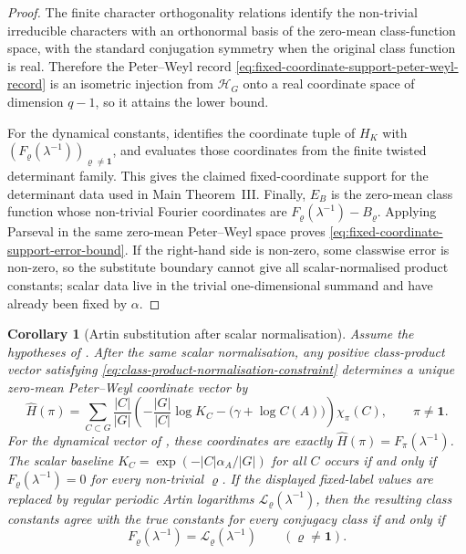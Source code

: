 \documentclass[11pt,a4paper]{amsart}
\theoremstyle{plain}
\newtheorem{corollary}[theorem]{Corollary}
\theoremstyle{definition}
\theoremstyle{remark}
\begin{document}
\begin{proof}
  The finite character orthogonality relations identify the non-trivial
  irreducible characters with an orthonormal basis of the zero-mean
  class-function space, with the standard conjugation symmetry when the
  original class function is real.  Therefore the Peter--Weyl record
  \eqref{eq:fixed-coordinate-support-peter-weyl-record} is an isometric injection
  from \(\mathcal H_G\) onto a real coordinate space of dimension \(q-1\), so
  it attains the lower bound.

  For the dynamical constants, 
  identifies the coordinate tuple of \(H_K\) with
  \((F_\varrho(\lambda^{-1}))_{\varrho\ne\mathbf1}\), and
   evaluates those coordinates
  from the finite twisted determinant family.  This gives the claimed
  fixed-coordinate support for the determinant data used in Main Theorem~III.
  Finally,
  \(E_B\) is the zero-mean class function whose non-trivial Fourier
  coordinates are
  \(F_\varrho(\lambda^{-1})-B_\varrho\).  Applying Parseval in the same
  zero-mean Peter--Weyl space proves
  \eqref{eq:fixed-coordinate-support-error-bound}.  If the right-hand side is
  non-zero, some classwise error is non-zero, so the substitute boundary
  cannot give all scalar-normalised product constants; scalar data live in
  the trivial one-dimensional summand and have already been fixed by
  \(\alpha\).
\end{proof}

\begin{corollary}[Artin substitution after scalar normalisation]
  \label{cor:class-product-artin-obstruction-recovery}
  \label{cor:class-product-artin-obstruction-readout}
  Assume the hypotheses of .  After the
  same scalar normalisation, any positive class-product vector satisfying
  \eqref{eq:class-product-normalisation-constraint} determines a unique
  zero-mean Peter--Weyl coordinate vector by
  \[
    \widehat H(\pi)
    =
    \sum_{C\subset G}\frac{|C|}{|G|}
      \left(-\frac{|G|}{|C|}\log K_C-\bigl(\gamma+\log C(A)\bigr)
      \right)\chi_\pi(C),
    \qquad \pi\ne\mathbf1 .
  \]
  For the dynamical vector of , these
  coordinates are exactly
  \(\widehat H(\pi)=F_\pi(\lambda^{-1})\).  The scalar baseline
  \(K_C=\exp(-|C|\alpha_A/|G|)\) for all \(C\) occurs if and only if
  \(F_\varrho(\lambda^{-1})=0\) for every non-trivial \(\varrho\).  If the
  displayed fixed-label values are replaced by regular periodic Artin
  logarithms \(\mathcal L_\varrho(\lambda^{-1})\), then the resulting class
  constants agree with the true constants for every conjugacy class if and
  only if
  \[
    F_\varrho(\lambda^{-1})=
    \mathcal L_\varrho(\lambda^{-1})
    \qquad(\varrho\ne\mathbf1).
  \]
\end{corollary}
\end{document}
